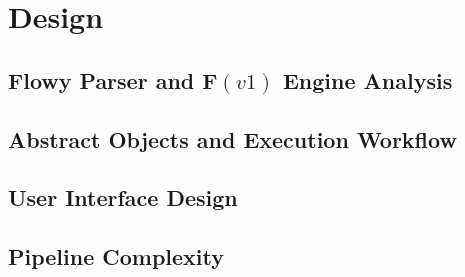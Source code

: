 \chapter{Design}\label{ch:design}

\section{Flowy Parser and F$(v1)$ Engine Analysis}\label{sec:adt-workflow}
\section{Abstract Objects and Execution Workflow}\label{sec:adt-workflow}
\section{User Interface Design}\label{sec:engine-interface}
\section{Pipeline Complexity}\label{sec:engine-complexity}

